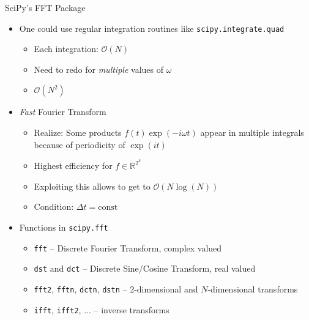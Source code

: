 \begin{frame}{SciPy's FFT Package}
%
\begin{itemize}
\item One could use regular integration routines like \texttt{scipy.integrate.quad}
	\begin{itemize}
	\item Each integration: $\mathcal{O}(N)$
	\item Need to redo for \emph{multiple} values of $\omega$
	\item[\Thus] $\mathcal{O}(N^2)$
	\end{itemize}
\item \emph{Fast} Fourier Transform
	\begin{itemize}
	\item Realize: Some products $f(t) \exp(-i\omega t)$ appear in multiple integrals because of periodicity of $\exp(it)$
	\item Highest efficiency for $f \in \mathbb{R}^{2^k}$
	\item Exploiting this allows to get to $\mathcal{O}(N \log(N))$
	\item Condition: $\Delta t = \text{const}$
	\end{itemize}
\item Functions in \texttt{scipy.fft}
	\begin{itemize}
	\item \texttt{fft} -- Discrete Fourier Transform, complex valued
	\item \texttt{dst} and \texttt{dct} -- Discrete Sine/Cosine Transform, real valued
	\item \texttt{fft2}, \texttt{fftn}, \texttt{dctn}, \texttt{dstn} -- 2-dimensional and $N$-dimensional transforms
	\item \texttt{ifft}, \texttt{ifft2}, ... -- inverse transforms
	\end{itemize}
\end{itemize}
%
\end{frame}


